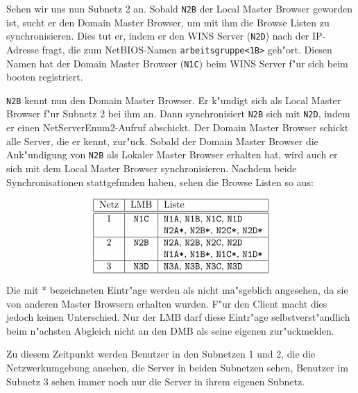 \documentclass{scrartcl}
\newcommand{\nbname}{\texttt}
\begin{document}
Sehen wir uns nun Subnetz 2 an. Sobald \nbname{N2B} der Local Master
Browser geworden ist, sucht er den Domain Master Browser, um mit ihm
die Browse Listen zu synchronisieren. Dies tut er, indem er den WINS
Server (\nbname{N2D}) nach der IP-Adresse fragt, die zum NetBIOS-Namen
\nbname{arbeitsgruppe<1B>} geh"ort. Diesen Namen hat der Domain Master
Browser (\nbname{N1C}) beim WINS Server f"ur sich beim booten
registriert.

\nbname{N2B} kennt nun den Domain Master Browser. Er k"undigt sich als
Local Master Browser f"ur Subnetz 2 bei ihm an. Dann synchronisiert
\nbname{N2B} sich mit \nbname{N2D}, indem er einen
NetServerEnum2-Aufruf abschickt. Der Domain Master Browser schickt
alle Server, die er kennt, zur"uck. Sobald der Domain Master Browser
die Ank"undigung von \nbname{N2B} als Lokaler Master Browser erhalten
hat, wird auch er sich mit dem Local Master Browser
synchronisieren. Nachdem beide Synchronisationen stattgefunden haben,
sehen die Browse Listen so aus:

\vspace{\baselineskip}
\[\begin{tabular}{|c|c|l|}
\hline
Netz & LMB &  Liste \\ \hline \hline
1 & \nbname{N1C} & \nbname{N1A}, \nbname{N1B}, \nbname{N1C}, \nbname{N1D}\\
  & & \nbname{N2A*}, \nbname{N2B*}, \nbname{N2C*}, \nbname{N2D*}\\
\hline
2 & \nbname{N2B} & \nbname{N2A}, \nbname{N2B}, \nbname{N2C}, \nbname{N2D}\\
& & \nbname{N1A*}, \nbname{N1B*}, \nbname{N1C*}, \nbname{N1D*}\\
\hline
3 & \nbname{N3D} & \nbname{N3A}, \nbname{N3B}, \nbname{N3C}, \nbname{N3D}\\
\hline
\end{tabular}\]
\vspace{\baselineskip}

Die mit * bezeichneten Eintr"age werden als nicht ma"sgeblich
angesehen, da sie von anderen Master Browsern erhalten wurden. F"ur
den Client macht dies jedoch keinen Unterschied. Nur der LMB darf
diese Eintr"age selbstverst"andlich beim n"achsten Abgleich nicht an
den DMB als seine eigenen zur"uckmelden.

Zu diesem Zeitpunkt werden Benutzer in den Subnetzen 1 und 2, die die
Netzwerkumgebung ansehen, die Server in beiden Subnetzen sehen,
Benutzer im Subnetz 3 sehen immer noch nur die Server in ihrem eigenen
Subnetz.
\end{document}
